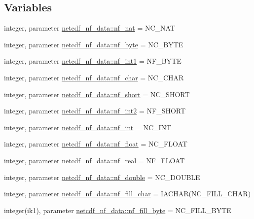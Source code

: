 \subsection*{Variables}
\begin{DoxyCompactItemize}
\item 
integer, parameter \hyperlink{namespacenetcdf__nf__data_a65b9ee2a9891b0be19394591f2c7d4bb}{netcdf\+\_\+nf\+\_\+data\+::nf\+\_\+nat} = N\+C\+\_\+\+N\+AT
\item 
integer, parameter \hyperlink{namespacenetcdf__nf__data_aec7b780370a3df9dc9822bcece408c1d}{netcdf\+\_\+nf\+\_\+data\+::nf\+\_\+byte} = N\+C\+\_\+\+B\+Y\+TE
\item 
integer, parameter \hyperlink{namespacenetcdf__nf__data_ad2132fc0056f1513a97f7c34f8b4b88d}{netcdf\+\_\+nf\+\_\+data\+::nf\+\_\+int1} = N\+F\+\_\+\+B\+Y\+TE
\item 
integer, parameter \hyperlink{namespacenetcdf__nf__data_af5efdb595b5f85635d7473630c9edfcf}{netcdf\+\_\+nf\+\_\+data\+::nf\+\_\+char} = N\+C\+\_\+\+C\+H\+AR
\item 
integer, parameter \hyperlink{namespacenetcdf__nf__data_adbccf2bc893d5aaf8de60224f39f67a8}{netcdf\+\_\+nf\+\_\+data\+::nf\+\_\+short} = N\+C\+\_\+\+S\+H\+O\+RT
\item 
integer, parameter \hyperlink{namespacenetcdf__nf__data_af796638afaa1f6ee28d04cc81d730376}{netcdf\+\_\+nf\+\_\+data\+::nf\+\_\+int2} = N\+F\+\_\+\+S\+H\+O\+RT
\item 
integer, parameter \hyperlink{namespacenetcdf__nf__data_a8bf2bf336581ce0275f24b0d2174ee6d}{netcdf\+\_\+nf\+\_\+data\+::nf\+\_\+int} = N\+C\+\_\+\+I\+NT
\item 
integer, parameter \hyperlink{namespacenetcdf__nf__data_a278e4bcb76b4a6ede0f2d5ce6774ef64}{netcdf\+\_\+nf\+\_\+data\+::nf\+\_\+float} = N\+C\+\_\+\+F\+L\+O\+AT
\item 
integer, parameter \hyperlink{namespacenetcdf__nf__data_a1d9182cde0ed15fe455e016e1c7f4ff4}{netcdf\+\_\+nf\+\_\+data\+::nf\+\_\+real} = N\+F\+\_\+\+F\+L\+O\+AT
\item 
integer, parameter \hyperlink{namespacenetcdf__nf__data_af52bf12a2c816e49939cbbfe60feb6ce}{netcdf\+\_\+nf\+\_\+data\+::nf\+\_\+double} = N\+C\+\_\+\+D\+O\+U\+B\+LE
\item 
integer, parameter \hyperlink{namespacenetcdf__nf__data_a81421f9927af1630f1a42f305fc0308f}{netcdf\+\_\+nf\+\_\+data\+::nf\+\_\+fill\+\_\+char} = I\+A\+C\+H\+AR(N\+C\+\_\+\+F\+I\+L\+L\+\_\+\+C\+H\+AR)
\item 
integer(ik1), parameter \hyperlink{namespacenetcdf__nf__data_a2a64867aa9d38a8ff5cbd606ef0478f8}{netcdf\+\_\+nf\+\_\+data\+::nf\+\_\+fill\+\_\+byte} = N\+C\+\_\+\+F\+I\+L\+L\+\_\+\+B\+Y\+TE

\end{DoxyCompactItemize}
